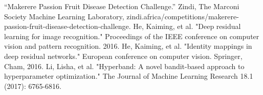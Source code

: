 \begin{thebibliography}{00}
 “Makerere Passion Fruit Disease Detection Challenge.” Zindi, The Marconi Society Machine Learning Laboratory, zindi.africa/competitions/makerere-passion-fruit-disease-detection-challenge.
 He, Kaiming, et al. "Deep residual learning for image recognition." Proceedings of the IEEE conference on computer vision and pattern recognition. 2016.
 He, Kaiming, et al. "Identity mappings in deep residual networks." European conference on computer vision. Springer, Cham, 2016.
 Li, Lisha, et al. "Hyperband: A novel bandit-based approach to hyperparameter optimization." The Journal of Machine Learning Research 18.1 (2017): 6765-6816.
\end{thebibliography}